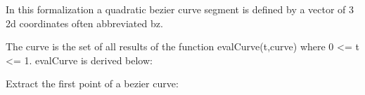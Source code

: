 \documentclass{article}
\begin{document}
\begin{Maple Normal}{
\begin{Maple Normal}{
}\end{Maple Normal}
}\end{Maple Normal}
\begin{Maple Normal}{
\begin{Maple Normal}{
In this formalization a quadratic bezier curve segment is defined by a vector of 3 2d coordinates often abbreviated bz.}\end{Maple Normal}

}\end{Maple Normal}

\begin{Maple Normal}{
\begin{Maple Normal}{
The curve is the set of all results of the function evalCurve(t,curve) where 0 <= t <= 1. evalCurve is derived below:}\end{Maple Normal}

}\end{Maple Normal}

\begin{Maple Normal}{
\begin{Maple Normal}{
}\end{Maple Normal}
}\end{Maple Normal}
\begin{Maple Normal}{
\begin{Maple Normal}{
Extract the first point of a bezier curve:}\end{Maple Normal}

}\end{Maple Normal}
\end{document}
